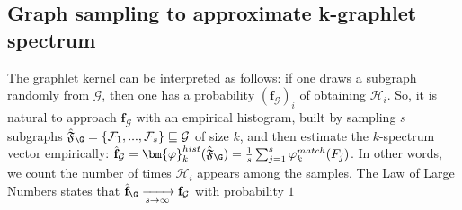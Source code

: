\subsection{Graph sampling to approximate k-graphlet spectrum}
\label{graph_sampling}

The graphlet kernel can be interpreted as follows: if one draws a subgraph randomly from $\mathcal{G}$, then one has a probability $(\mathbf{f}_\mathcal{G})_i$ of obtaining $\mathcal{H}_i$. So, it is natural to approach $\mathbf{f}_\mathcal{G}$ with an empirical histogram, built by  sampling $s$ subgraphs $\hat{\mathfrak{F}}_\G=\{\mathcal{F}_1,...,\mathcal{F}_s\} \sqsubseteq \mathcal{G}$ of size $k$, and then estimate the $k$-spectrum vector empirically: $\hat{\mathbf{f}}_\mathcal{G} =\bm{\varphi}_k^{hist}(\hat{\mathfrak{F}}_\G)= \frac{1}{s}\sum_{j=1}^s \varphi^{match}_k(F_j)$. In other words, we count the number of times $\mathcal{H}_i$ appears among the samples. The Law of Large Numbers states that $\hat{\mathbf{f}}_\G \xrightarrow[s \to \infty]{} \mathbf{f}_\mathcal{G}$ with probability $1$ 

